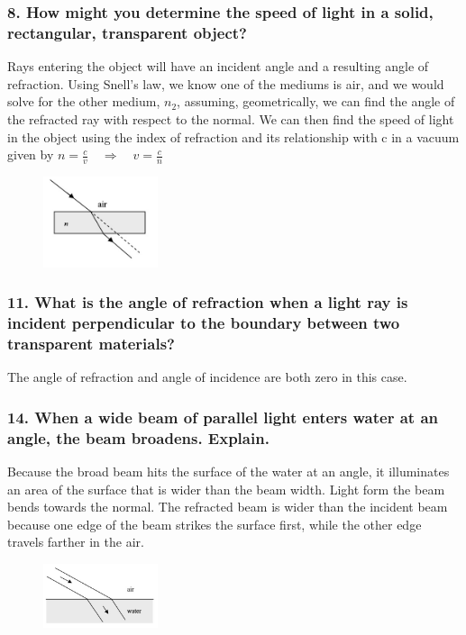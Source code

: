 \documentclass{article}
\newcommand\rr{\quad\Rightarrow\quad}
\begin{document}
\subsubsection*{
    8. How might you determine the speed of light in a solid, rectangular,
    transparent object?
}
Rays entering the object will have an incident angle and a resulting angle of
refraction. Using Snell's law, we know one of the mediums is air, and we would
solve for the other medium, $n_2$, assuming, geometrically, we can find the
angle of the refracted ray with respect to the normal. We can then find the
speed of light in the object using the index of refraction and its relationship
with c in a vacuum given by $n = \displaystyle\frac{c}{v} \rr v =
\displaystyle\frac c n$
\begin{figure}[h]
    \begin{center}
        \includegraphics[width=0.3\textwidth]{figures/q8a.jpg}
    \end{center}
\end{figure}
\subsubsection*{
    11. What is the angle of refraction when a light ray is incident
    perpendicular to the boundary between two transparent materials?
}
The angle of refraction and angle of incidence are both zero in this case.
\subsubsection*{
    14. When a wide beam of parallel light enters water at an angle,
    the beam broadens. Explain.
}
Because the broad beam hits the surface of the water at an angle, it illuminates
an area of the surface that is wider than the beam width. Light form the beam
bends towards the normal. The refracted beam is wider than the incident beam
because one edge of the beam strikes the surface first, while the other edge
travels farther in the air. 
\begin{figure}[h]
    \begin{center}
        \includegraphics[width=0.3\textwidth]{figures/q14a.jpg}
    \end{center}
\end{figure}
\end{document}
